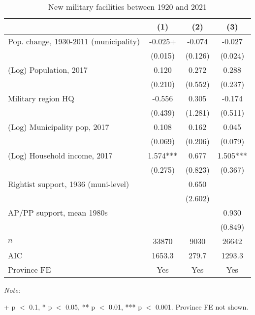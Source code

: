 \begin{table}[!h]

\caption{New military facilities between 1920 and 2021\label{tab:glm\_new\_cuarteles}}
\centering
\begin{threeparttable}
\begin{tabular}[t]{lccc}
\toprule
  & (1) & (2) & (3)\\
\midrule
Pop. change, 1930-2011 (municipality) & -0.025+ & -0.074 & -0.027\\
 & (0.015) & (0.126) & (0.024)\\
(Log) Population, 2017 & 0.120 & 0.272 & 0.288\\
 & (0.210) & (0.552) & (0.237)\\
Military region HQ & -0.556 & 0.305 & -0.174\\
 & (0.439) & (1.281) & (0.511)\\
(Log) Municipality pop, 2017 & 0.108 & 0.162 & 0.045\\
 & (0.069) & (0.206) & (0.079)\\
(Log) Household income, 2017 & 1.574*** & 0.677 & 1.505***\\
 & (0.275) & (0.823) & (0.367)\\
Rightist support, 1936 (muni-level) &  & 0.650 & \\
 &  & (2.602) & \\
AP/PP support, mean 1980s &  &  & 0.930\\
 &  &  & (0.849)\\
\midrule
$n$ & 33870 & 9030 & 26642\\
AIC & 1653.3 & 279.7 & 1293.3\\
Province FE & Yes & Yes & Yes\\
\bottomrule
\end{tabular}
\begin{tablenotes}[para]
\item \textit{Note: } 
\item + p $<$ 0.1, * p $<$ 0.05, ** p $<$ 0.01, *** p $<$ 0.001. Province FE not shown.
\end{tablenotes}
\end{threeparttable}
\end{table}
